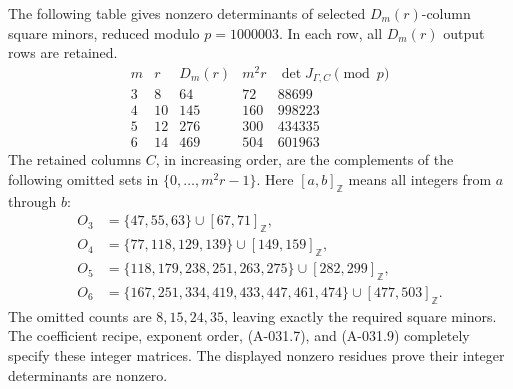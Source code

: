 The following table gives nonzero determinants of selected
\(D_m(r)\)-column square minors, reduced modulo \(p=1000003\).
In each row, all \(D_m(r)\) output rows are retained.
\[
\begin{array}{c|c|r|r|r}
 m&r&D_m(r)&m^2r&\det J_{\Gamma,C}\pmod p\\ \hline
 3&8&64&72&88699\\
 4&10&145&160&998223\\
 5&12&276&300&434335\\
 6&14&469&504&601963
\end{array}                                                    \tag{A-031.8}
\]
The retained columns \(C\), in increasing order, are the complements
of the following omitted sets in \(\{0,\ldots,m^2r-1\}\).
Here \([a,b]_{\mathbb Z}\) means all integers from \(a\) through \(b\):
\[
\begin{aligned}
 O_3&=\{47,55,63\}\cup[67,71]_{\mathbb Z},\\
 O_4&=\{77,118,129,139\}\cup[149,159]_{\mathbb Z},\\
 O_5&=\{118,179,238,251,263,275\}\cup[282,299]_{\mathbb Z},\\
 O_6&=\{167,251,334,419,433,447,461,474\}
                                      \cup[477,503]_{\mathbb Z}.
\end{aligned}                                                  \tag{A-031.9}
\]
The omitted counts are \(8,15,24,35\), leaving exactly the required
square minors. The coefficient recipe, exponent order,
(A-031.7), and (A-031.9) completely specify these integer matrices.
The displayed nonzero residues prove their integer determinants
are nonzero.

